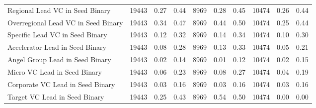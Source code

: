 {\begin{table}[!h]
{\begin{tabular}[t]{lrrrrrrrrr}
Regional Lead VC in Seed Binary & 19443 & 0.27 & 0.44 & 8969 & 0.28 & 0.45 & 10474 & 0.26 & 0.44\\
Overregional Lead VC in Seed Binary & 19443 & 0.34 & 0.47 & 8969 & 0.44 & 0.50 & 10474 & 0.25 & 0.44\\
Specific Lead VC in Seed Binary & 19443 & 0.12 & 0.32 & 8969 & 0.14 & 0.34 & 10474 & 0.10 & 0.30\\
Accelerator Lead in Seed Binary & 19443 & 0.08 & 0.28 & 8969 & 0.13 & 0.33 & 10474 & 0.05 & 0.21\\
\addlinespace
Angel Group Lead in Seed Binary & 19443 & 0.02 & 0.14 & 8969 & 0.01 & 0.12 & 10474 & 0.02 & 0.15\\
Micro VC Lead in Seed Binary & 19443 & 0.06 & 0.23 & 8969 & 0.08 & 0.27 & 10474 & 0.04 & 0.19\\
Corporate VC Lead in Seed Binary & 19443 & 0.03 & 0.16 & 8969 & 0.03 & 0.16 & 10474 & 0.03 & 0.16\\
Target VC Lead in Seed Binary & 19443 & 0.25 & 0.43 & 8969 & 0.54 & 0.50 & 10474 & 0.00 & 0.00\\
\bottomrule
\end{tabular}}
\end{table}
}
